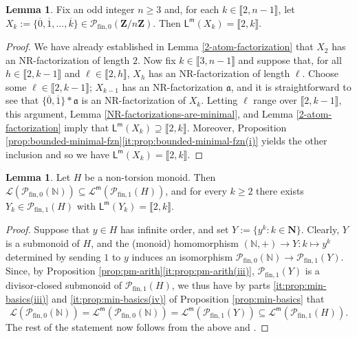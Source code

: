 \documentclass{report}
\newcommand{\NN}{\mathbb{N}}
\renewcommand{\P}{\mathcal{P}}
\newcommand{\llb}{\llbracket}
\newcommand{\rrb}{\rrbracket}
\newcommand{\fin}{\textrm{fin}}
\newcommand{\fun}{{\textrm{fin}, 1}}
\newcommand{\m}{{\mathsf{m}}}
\renewcommand{\:}{\text{:}}
\theoremstyle{definition}
\newtheorem{lemma}[defn]{Lemma}
\begin{document}
\begin{lemma}\label{lem:interval-minimal-length-sets}
	Fix an odd integer $n\ge 3$ and, for each $k\in \llb2,n-1\rrb$, let $X_k := \{\overline{0},\overline{1}, \dots, \overline{k} \} \in  \P_{\fin,0}(\mathbf{Z}/n\mathbf{Z})$.
	Then $\mathsf{L}^\m(X_k) = \llb 2,k \rrb$.
\end{lemma}

\begin{proof}
	We have already established in Lemma \ref{2-atom-factorization} that $X_2$ has an NR-factorization of length $2$.
	Now fix $k \in \llb 3, n-1 \rrb$ and suppose that, for all $h \in \llb 2, k-1 \rrb$ and $\ell \in \llb 2,h \rrb$, $X_h$ has an NR-factorization of length $\ell$.
	Choose some $\ell \in \llb 2,k-1 \rrb$; $X_{k-1}$ has an NR-factorization $\mathfrak{a}$, and it is straightforward to see that $\{\overline{0},\overline{1}\}*\mathfrak{a}$ is an NR-factorization of $X_k$.
	Letting $\ell$ range over $\llb 2,k-1\rrb$, this argument, Lemma \ref{NR-factorizations-are-minimal}, and Lemma \ref{2-atom-factorization} imply that $\mathsf{L}^\m(X_k) \supseteq \llb 2, k \rrb$.
	Moreover, Proposition \ref{prop:bounded-minimal-fzn}\ref{it:prop:bounded-minimal-fzn(i)} yields the other inclusion and so we have  $\mathsf{L}^\m(X_k) = \llb 2,k \rrb$.
\end{proof}


\begin{lemma}\label{prop:intervals-in-N}
	Let $H$ be a non-torsion monoid.
	Then $\mathscr{L}(\P_{\fin,0}(\NN)) \subseteq \mathscr{L}^\m(\P_\fun(H))$, and for every $k\ge 2$ there exists $Y_k\in \P_\fun(H)$ with $\mathsf{L}^\m(Y_k) = \llb 2, k \rrb$.
\end{lemma}

\begin{proof}
	Suppose that $y\in H$ has infinite order, and set $Y := \{y^k: k \in \mathbf N\}$. Clearly, $Y$ is a submonoid of $H$, and the (monoid) homomorphism $(\NN,+) \to Y: k \mapsto y^k$ determined by sending $1$ to $y$ induces an iso\-morphism $\P_{\fin,0}(\NN) \to \P_\fun(Y)$.
	Since, by Proposition \ref{prop:pm-arith}\ref{it:prop:pm-arith(iii)}, $\P_\fun(Y)$ is a divisor-closed submonoid of $\P_\fun(H)$, we thus have by parts \ref{it:prop:min-basics(iii)} and \ref{it:prop:min-basics(iv)} of Proposition \ref{prop:min-basics} that
	\[
	\mathscr{L}(\P_{\fin,0}(\NN)) = \mathscr{L}^\m(\P_{\fin,0}(\NN)) = \mathscr{L}^\m(\P_\fun(Y)) \subseteq \mathscr{L}^\m(\P_\fun(H)).
	\]
	The rest of the statement now follows from the above and \cite[Proposition 4.8]{fan-tringali18}.
\end{proof}
\end{document}
